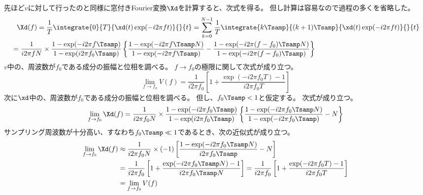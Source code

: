            先ほど$v$に対して行ったのと同様に窓付きFourier変換$\Xd$を計算すると、次式を得る。
            但し計算は容易なので過程の多くを省略した。
            \begin{align*}
                &\phantom{=} \Xd(f) = \frac{1}{T} \integrate{0}{T}{\xd(t)\exp(-i 2\pi f t)}{}{t} = \sum_{k=0}^{N-1} \frac{1}{T} \integrate{k\Tsamp}{(k+1)\Tsamp}{\xd(t)\exp(-i 2\pi f t)}{}{t} \\
                &= \frac{1}{i 2\pi f N}\times\frac{1-\exp(-i 2\pi f\Tsamp)}{1-\exp(i 2\pi f_0\Tsamp)} \left\{\frac{1-\exp(-i 2\pi f \Tsamp N)}{1-\exp(-i 2\pi f \Tsamp)} - \frac{1-\exp(-i 2\pi (f-f_0) \Tsamp N)}{1-\exp(-i 2\pi (f-f_0) \Tsamp)}\right\}
            \end{align*}
            $v$中の、周波数が$f_0$である成分の振幅と位相を調べる。
            $f\to f_0$の極限に関して次式が成り立つ。
            \[ \lim_{f\to f_0} V(f) = \frac{1}{i2\pi f_0}\left[1 + \frac{\exp(-i 2\pi f_0 T)-1}{i 2\pi f_0 T}\right] \]
            次に$\xd$中の、周波数が$f_0$である成分の振幅と位相を調べる。
            但し、$f_0\Tsamp < 1$と仮定する。
            次式が成り立つ。
            \[ \lim_{f\to f_0} \Xd(f) = \frac{1}{i 2\pi f_0 N}\times\frac{1-\exp(-i 2\pi f_0\Tsamp)}{1-\exp(i 2\pi f_0\Tsamp)}\left\{\frac{1-\exp(-i 2\pi f_0 \Tsamp N)}{1-\exp(-i 2\pi f_0 \Tsamp)} - N\right\} \]
            サンプリング周波数が十分高い、すなわち$f_0\Tsamp\ll 1$であるとき、次の近似式が成り立つ。
            \begin{align*}
                \lim_{f\to f_0} \Xd(f) &\approx \frac{1}{i 2\pi f_0 N}\times(-1)\left[\frac{1-\exp(-i 2\pi f_0 \Tsamp N)}{i 2\pi f_0 \Tsamp} - N\right] \\
                &= \frac{1}{i 2\pi f_0}\left[1 + \frac{\exp(-i 2\pi f_0 \Tsamp N)-1}{i 2\pi f_0 \Tsamp N}\right] = \frac{1}{i 2\pi f_0}\left[1 + \frac{\exp(-i 2\pi f_0 T)-1}{i 2\pi f_0 T}\right] \\
                &=  \lim_{f\to f_0} V(f)
            \end{align*}

